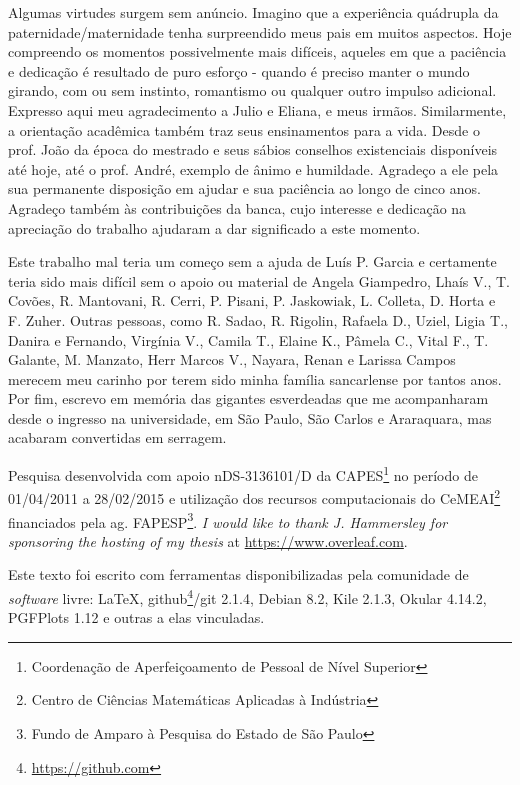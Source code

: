 Algumas virtudes surgem sem anúncio.
Imagino que a experiência quádrupla da paternidade/maternidade tenha surpreendido meus pais em muitos aspectos.
Hoje compreendo os momentos possivelmente mais difíceis, aqueles em que a paciência e dedicação é resultado de puro esforço - quando é preciso manter o mundo girando, com ou sem instinto, romantismo ou qualquer outro impulso adicional.
Expresso aqui meu agradecimento a Julio e Eliana, e meus irmãos.
Similarmente, a orientação acadêmica também traz seus ensinamentos para a vida.
Desde o prof. João da época do mestrado e seus sábios conselhos existenciais disponíveis até hoje, até o prof. André, exemplo de ânimo e humildade.
Agradeço a ele pela sua permanente disposição em ajudar e sua paciência ao longo de cinco anos.
Agradeço também às contribuições da banca, cujo interesse e dedicação na apreciação do trabalho ajudaram a dar significado a este momento.

Este trabalho mal teria um começo sem a ajuda de Luís P. Garcia e certamente teria sido mais difícil sem o apoio ou material de Angela Giampedro, Lhaís V., T. Covões, R. Mantovani, R. Cerri, P. Pisani, P. Jaskowiak, L. Colleta, D. Horta e F. Zuher.
Outras pessoas, como R. Sadao, R. Rigolin, Rafaela D., Uziel, Ligia T., Danira e Fernando, Virgínia V., Camila T., Elaine K., Pâmela C., Vital F., T. Galante, M. Manzato, Herr Marcos V., Nayara, Renan e Larissa Campos merecem meu carinho por terem sido minha família sancarlense por tantos anos.
Por fim, escrevo em memória das gigantes esverdeadas que me acompanharam desde o ingresso na universidade, em São Paulo, São Carlos e Araraquara, mas acabaram convertidas em serragem.

%
{\footnotesize
Pesquisa desenvolvida com apoio n\textordmasculine DS-3136101/D da CAPES\footnote{Coordenação de Aperfeiçoamento de Pessoal de Nível Superior} no período de 01/04/2011 a 28/02/2015 e utilização dos recursos computacionais do CeMEAI\footnote{Centro de Ciências Matemáticas Aplicadas à Indústria} financiados pela ag. FAPESP\footnote{Fundo de Amparo à Pesquisa do Estado de São Paulo}.
\textit{I would like to thank J. Hammersley for sponsoring the hosting of my thesis} at \url{https://www.overleaf.com}.

Este texto foi escrito com ferramentas disponibilizadas pela comunidade de \textit{software} livre:
\LaTeX, github\footnote{\url{https://github.com}}/git 2.1.4, Debian 8.2, Kile 2.1.3, Okular 4.14.2, PGFPlots 1.12 e outras a elas vinculadas.
}

